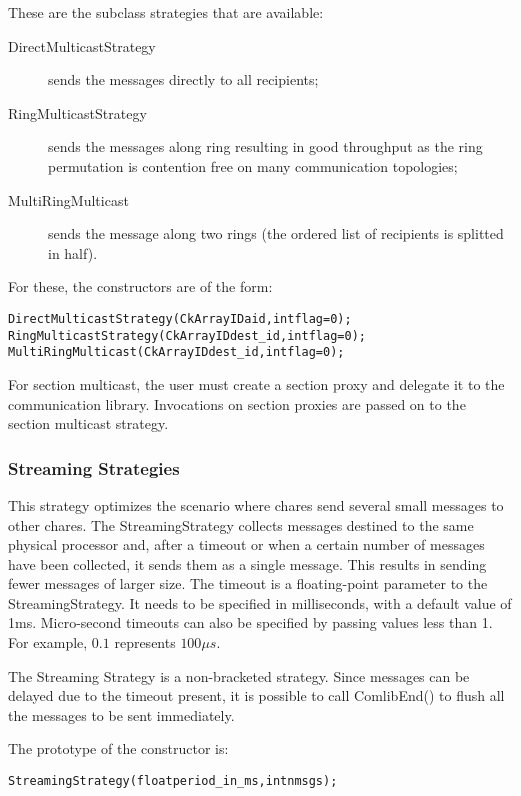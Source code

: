 {These are the subclass strategies that are available:

\begin{description}
\item[DirectMulticastStrategy] sends the messages directly to all recipients;
\item[RingMulticastStrategy] sends the messages along ring resulting in good throughput as the ring permutation is contention free on many communication topologies;
\item[MultiRingMulticast] sends the message along two rings (the ordered list of recipients is splitted in half).
\end{description}

For these, the constructors are of the form:

\begin{alltt}
DirectMulticastStrategy(CkArrayID aid, int flag=0);
RingMulticastStrategy(CkArrayID dest_id, int flag=0);
MultiRingMulticast(CkArrayID dest_id, int flag=0);
\end{alltt}

For section multicast, the user must create a section proxy and delegate it to
the communication library. Invocations on section proxies are passed on to the
section multicast strategy.


\subsubsection{Streaming Strategies}

This strategy optimizes the scenario where chares send several small messages to
other chares. The StreamingStrategy collects messages destined to the same
physical processor and, after a timeout or when a certain number of messages
have been collected, it sends them as a single message. This results in sending
fewer messages of larger size. The timeout is a floating-point parameter to the
StreamingStrategy. It needs to be specified in milliseconds, with a default
value of 1ms. Micro-second timeouts can also be specified by passing values less
than 1. For example, $0.1$ represents $100\mu s$.

The Streaming Strategy is a non-bracketed strategy. Since messages can be
delayed due to the timeout present, it is possible to call
{\textrm{ComlibEnd()}} to flush all the messages to be sent immediately.

The prototype of the constructor is:

\begin{alltt}
StreamingStrategy(float period\_in\_ms, int nmsgs);
\end{alltt}

}
